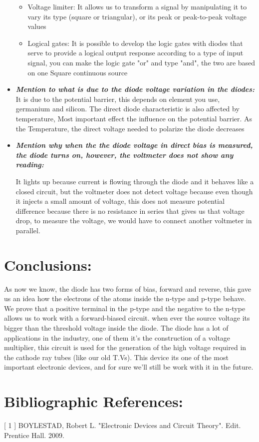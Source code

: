 \documentclass[10pt,a4paper]{article}
\begin{document}
\begin{itemize}
\begin{itemize}
\item Voltage limiter: It allows us to transform a signal by manipulating it to vary its type (square or triangular), or its peak or peak-to-peak voltage values

\item Logical gates: It is possible to develop the logic gates with diodes that serve to provide a logical output response according to a type of input signal, you can make the logic gate "or" and type "and", the two are based on one Square continuous source
\end{itemize}

\item {\bfseries\itshape Mention to what is due to the diode voltage variation in the diodes:}
It is due to the potential barrier, this depends on element you use, germanium and silicon.
The direct diode characteristic is also affected by temperature,
Most important effect the influence on the potential barrier. As the
Temperature, the direct voltage needed to polarize the diode decreases


\item {\bfseries\itshape Mention why when the the diode voltage in direct bias is measured, the diode
turns on, however, the voltmeter does not show any reading:}

It lights up because current is flowing through the diode and it behaves like a closed circuit, but the voltmeter does not detect voltage because even though it injects a small amount of voltage, this does not measure potential difference because there is no resistance in series that gives us that voltage drop, to measure the voltage, we would have to connect another voltmeter in parallel.
\end{itemize}

\pagebreak

\section{Conclusions:}

As now we know, the diode has two forms of bias, forward and reverse, this gave us an idea how the electrons of the atoms inside the n-type and p-type behave. We prove that a positive terminal in the p-type and the negative to the n-type allows us to work with a forward-biased circuit. when ever the source voltage its bigger than the threshold voltage inside the diode. The diode has a lot of applications in the industry, one of them it's the construction of a voltage multiplier, this circuit is used for the generation of the high voltage required in the cathode ray tubes (like our old T.Vs). This device its one of the most important electronic devices, and for sure we'll still be work with it in the future. 


\pagebreak

\section{Bibliographic References:}

[ 1 ] BOYLESTAD, Robert L. "Electronic Devices and Circuit Theory". Edit. Prentice Hall. 2009.
\end{document}
